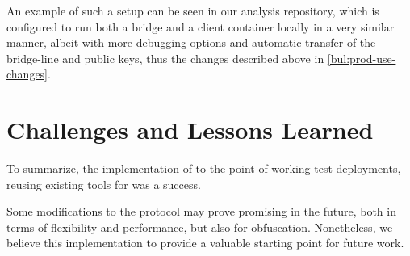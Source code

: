 An example of such a setup can be seen in our analysis repository, which is configured to run both a bridge and a client container locally in a very similar manner, albeit with more debugging options and automatic transfer of the bridge-line and public keys, thus the changes described above in \cref{bul:prod-use-changes}.

\section{Challenges and Lessons Learned} \label{sec:challenges-learnings}

To summarize, the implementation of \drivel{} to the point of working test deployments, reusing existing tools for \obfsfour{} was a success.

Some modifications to the protocol may prove promising in the future, both in terms of flexibility and performance, but also for obfuscation. Nonetheless, we believe this implementation to provide a valuable starting point for future work.

